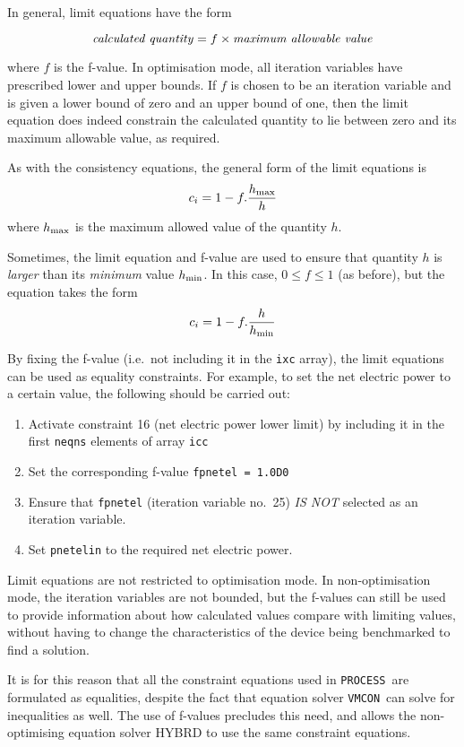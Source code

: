 \documentclass[11pt,a4paper]{report}
\newcommand{\process}{\mbox{\texttt{PROCESS}}}
\newcommand{\vmcon}{\mbox{\texttt{VMCON}}}
\begin{document}
In general, limit equations have the form

\[ \mbox{\textit{calculated quantity}} = f \times \mbox{\textit{maximum allowable
value}} \]

where $f$ is the f-value. In optimisation mode, all iteration variables have
prescribed lower and upper bounds. If $f$ is chosen to be an iteration
variable and is given a lower bound of zero and an upper bound of one, then
the limit equation does indeed constrain the calculated quantity to lie
between zero and its maximum allowable value, as required.

As with the consistency equations, the general form of the limit equations is
\[ c_i = 1 - f.\frac{h_{\mbox{\scriptsize max}}}{h} \]
where $h_{\mbox{\scriptsize max}}$ is the maximum allowed value of the quantity $h$.

Sometimes, the limit equation and f-value are used to ensure that quantity $h$
is \textit{larger}\/ than its \textit{minimum}\/ value $h_{\mbox{\scriptsize min}}$. In
this case, $0 \leq f \leq 1$ (as before), but the equation takes the form
\[ c_i = 1 - f.\frac{h}{h_{\mbox{\scriptsize min}}} \]

By fixing the f-value (i.e.\ not including it in the \texttt{ixc} array), the
limit equations can be used as equality constraints. For example, to set the
net electric power to a certain value, the following should be carried out:
\begin{enumerate}
\item Activate constraint 16 (net electric power lower limit) by including it in the first
  \texttt{neqns} elements of array \texttt{icc}
\item Set the corresponding f-value \texttt{fpnetel = 1.0D0}
\item Ensure that \texttt{fpnetel} (iteration variable no.\ 25) \textit{IS
    NOT}\/ selected as an iteration variable.
\item Set \texttt{pnetelin} to the required net electric power.
\end{enumerate}

Limit equations are not restricted to optimisation mode. In non-optimisation
mode, the iteration variables are not bounded, but the f-values can still be
used to provide information about how calculated values compare with limiting
values, without having to change the characteristics of the device being
benchmarked to find a solution.

It is for this reason that all the constraint equations used in \process\ are
formulated as equalities, despite the fact that equation solver \vmcon\ can
solve for inequalities as well. The use of f-values precludes this need, and
allows the non-optimising equation solver HYBRD to use the same constraint
equations.
\end{document}
